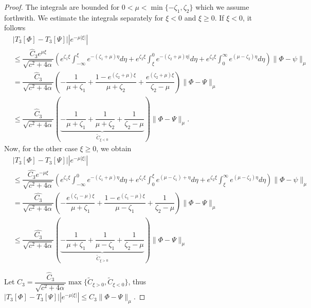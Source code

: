\documentclass[11pt]{article}
\theoremstyle{definition}
\begin{document}
{\begin{proof}
The integrals are bounded for $0< \mu< \min\{-\zeta_1, \zeta_2\}$ which we assume forthwith. We estimate the integrals separately for $\xi<0$ and $\xi \ge 0$. If $\xi <0$, it follows 
\begin{align}
     &  |T_3[\Phi]-T_3[\Psi]||e^{- \mu |\xi|}| \\ &\le\dfrac{\widehat{C}_3 e^{\mu \xi}}{\sqrt{c^2+ 4  \alpha}}\left( e^{\zeta_1 \xi}\int_{- \infty}^{\xi}e^{-(\zeta_1+ \mu)\eta} d \eta 
 + e^{\zeta_2 \xi}\int_{\xi}^{0 }e^{-(\zeta_2+ \mu)\eta|} d \eta + e^{\zeta_2 \xi}\int_{0}^{\infty }e^{(\mu-\zeta_2)\eta} d \eta\right)\|\Phi-\psi\|_\mu    \\ &= \dfrac{\widehat{C}_3}{\sqrt{c^2+4  \alpha}} \left( - \dfrac{1}{\mu + \zeta_1}+ \dfrac{1-e^{{(\zeta_2+\mu)\xi}}}{\mu+ \zeta_2}+ \dfrac{e^{(\zeta_2+\mu)\xi}}{\zeta_2- \mu} \right) \|\Phi-\Psi\|_\mu \\ &\le   \dfrac{\widehat{C}_3}{\sqrt{c^2+4 \alpha}} \left(\underbrace{ - \dfrac{1}{\mu + \zeta_1}+ \dfrac{1}{\mu+ \zeta_2}+ \dfrac{1}{\zeta_2- \mu}}_{\tilde C_{\xi <0}} \right) \|\Phi-\Psi\|_\mu.
\end{align}
Now, for the other case $\xi \geq 0$, we obtain \begin{align}
     &  |T_3[\Phi]-T_3[\Psi]||e^{- \mu |\xi|}| \\ &\le\dfrac{\hat{C_3} e^{-\mu \xi}}{\sqrt{c^2+ 4  \alpha}}\left( e^{\zeta_1 \xi}\int_{- \infty}^{0}e^{-(\zeta_1+ \mu)\eta} d \eta 
 + e^{\zeta_1 \xi}\int_{0}^{\xi }e^{(\mu-\zeta_1)+ \eta} d \eta + e^{\zeta_2 \xi}\int_{\xi}^{\infty }e^{(\mu-\zeta_2)\eta} d \eta\right)\|\Phi-\psi\|_\mu    \\ &= \dfrac{\hat{C_3}}{\sqrt{c^2+4  \alpha}} \left( - \dfrac{e^{(\zeta_1-\mu)\xi}}{\mu + \zeta_1}+ \dfrac{1-e^{{(\zeta_1-\mu)\xi}}}{\mu- \zeta_1}+ \dfrac{1}{\zeta_2- \mu} \right) \|\Phi-\Psi\|_\mu \\ &\le   \dfrac{\hat{C_3}}{\sqrt{c^2+4  \alpha}} \left(\underbrace{ - \dfrac{1}{\mu + \zeta_1}+ \dfrac{1}{\mu- \zeta_1}+ \dfrac{1}{\zeta_2- \mu}}_{\tilde C_{\xi >0}} \right) \|\Phi-\Psi\|_\mu
\end{align}

Let $C_3=\dfrac{\widehat{C}_3}{\sqrt{c^2+4  \alpha}}\max\{\tilde C_{\xi>0}, \tilde C_{\xi<0}\}$, thus $|T_3[\Phi]-T_3[\Psi]||e^{- \mu |\xi|}| \le C_3 \|\Phi-\Psi\|_\mu$.


\end{proof}}
\end{document}
